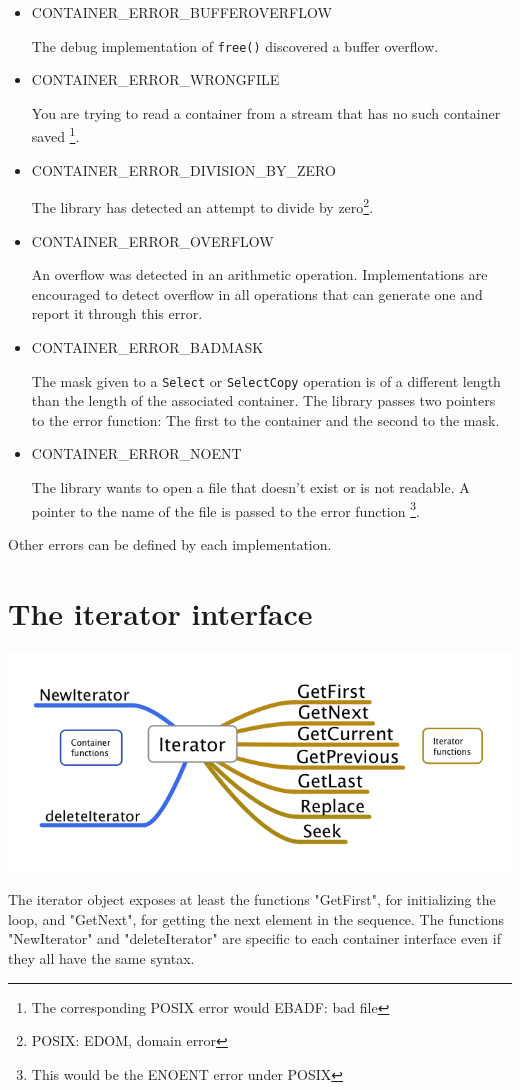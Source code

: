 \documentclass[12pt,a4paper]{memoir} %
\newif\iftth
\newcommand{\doerror}[1]{%
\par\noindent
\iftth
{CONTAINER\_ERROR\_#1}
\else
{\footnotesize CONTAINER\_ERROR\_#1}
\fi
}
\begin{document}
\begin{itemize}
\doerror{BADPOINTER} The debug implementation of \texttt{free()} has discovered an incorrect pointer attempting to be freed\footnote{In POSIX this would 
be EFAULT.}.
\item
\doerror{BUFFEROVERFLOW} The debug implementation of \texttt{free()} discovered a buffer overflow.
\item
\doerror{WRONGFILE} You are trying to read a container from a stream that has no such container saved
\footnote{The corresponding POSIX error would EBADF: bad file}.
\item 
\doerror{DIVISION\_BY\_ZERO} The library has detected an attempt to divide by zero\footnote{POSIX: EDOM, domain error}.
\item
\doerror{OVERFLOW} An overflow was detected in an arithmetic operation. Implementations are encouraged to detect overflow in all operations that
can generate one and report it through this error.
\item
\doerror{BADMASK} The mask given to a \verb,Select, or \verb,SelectCopy, operation is of a different length than the length of the associated
container. The library passes two pointers to the error function: The first to the container and the second to the mask.
\item
\doerror{NOENT} The library wants to open a file that doesn't exist or is not readable. A pointer to the name of the file is passed to the error function
\footnote{This would be the ENOENT error under POSIX}.
\end{itemize}


Other errors can be defined by each implementation.

\section{The iterator interface}
\includegraphics[scale=0.62]{Iterator.png}\par
The iterator object exposes at least the functions "GetFirst", for initializing the loop, and "GetNext", for getting the next element in the sequence. 
The functions "NewIterator" and "deleteIterator" are specific to each container interface even if they all have the same syntax.
\end{document}
